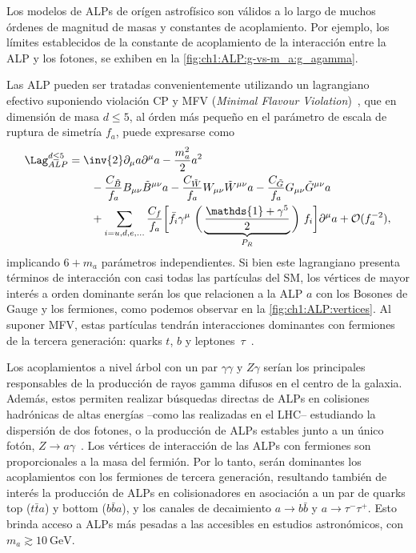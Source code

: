 Los modelos de ALPs de orígen astrofísico son válidos a lo largo de muchos órdenes de magnitud de masas y constantes de acoplamiento. Por ejemplo, los límites establecidos de la constante de acoplamiento de la interacción entre la ALP y los fotones, se exhiben en la \cref{fig:ch1:ALP:g-vs-m_a:g_agamma}.

Las ALP pueden ser tratadas convenientemente utilizando un lagrangiano efectivo suponiendo violación CP y MFV (\textit{Minimal Flavour Violation})~\cite{DAmbrosio2002}, que en dimensión de masa $d \leq 5$, al órden más pequeño en el parámetro de escala de ruptura de simetría $f_a$, puede expresarse como
\begin{align*}
  \Lag_{ALP}^{d \leq 5} &= \inv{2} \partial_\mu a \partial^\mu a - \frac{m_a^2}{2} a^2 \\*
             &\quad\quad - \frac{C_{\tilde{B}}}{f_a} B_{\mu\nu} \tilde{B}^{\mu\nu} a - \frac{C_{\tilde{W}}}{f_a} W_{\mu\nu} \tilde{W}^{\mu\nu} a - \frac{C_{\tilde{G}}}{f_a} G_{\mu\nu} \tilde{G}^{\mu\nu} a \\*
             &\quad\quad + \sum_{i = u, d, e, \dots} \frac{C_f}{f_a} \bigg[ \bar{f}_i \gamma^\mu \ \bigg( \underbrace{\frac{\mathds{1} + \gamma^5}{2}}_{P_R} \bigg) \ f_i \bigg] \partial^\mu a + \mathcal{O}( f_a^{-2} ),
\end{align*}
implicando $6 + m_a$ parámetros independientes. Si bien este lagrangiano presenta términos de interacción con casi todas las partículas del SM, los vértices de mayor interés a orden dominante serán los que relacionen a la ALP $a$ con los Bosones de Gauge y los fermiones, como podemos observar en la \cref{fig:ch1:ALP:vertices}. Al suponer MFV, estas partículas tendrán interacciones dominantes con fermiones de la tercera generación: quarks $t$, $b$ y leptones~$\tau$~\cite{Bauer2017,Bauer2017a,Bauer2019}.

Los acoplamientos a nivel árbol con un par $\gamma\gamma$ y $Z\gamma$ serían los principales responsables de la producción de rayos gamma difusos en el centro de la galaxia. Además, estos permiten realizar búsquedas directas de ALPs en colisiones hadrónicas de altas energías --como las realizadas en el LHC-- estudiando la dispersión de dos fotones, o la producción de ALPs estables junto a un único fotón, $Z \to a\gamma$~\cite{Schmieden2021,TheATLASCollaboration2021}. Los vértices de interacción de las ALPs con fermiones son proporcionales a la masa del fermión. Por lo tanto, serán dominantes los acoplamientos con los fermiones de tercera generación, resultando también de interés la producción de ALPs en colisionadores en asociación a un par de quarks top ($t\bar{t}a$) y bottom ($b\bar{b}a$), y los canales de decaimiento $a \to b\bar{b}$ y $a \to \tau^-\tau^+$. Esto brinda acceso a ALPs más pesadas a las accesibles en estudios astronómicos, con $m_a \gtrsim \SI{10}{\GeV}$. 

